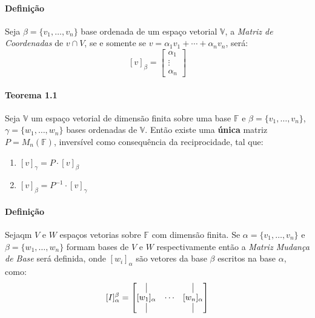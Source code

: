 \documentclass{article}
\begin{document}
        \paragraph{Definição}Seja $\beta = \{ v_{1}, \dots, v_{n} \}$ base ordenada de um espaço vetorial $\mathbb{V}$, a \textit{Matriz de Coordenadas} de $v\cap V$, se e somente se $v=\alpha_{1}v_{1}+\cdots+\alpha_{n}v_{n}$, será:
            \[[v]_{\beta}=\begin{bmatrix}\alpha_{1}\\ \vdots\\ \alpha_{n}\end{bmatrix}\]

        \paragraph{Teorema 1.1}Seja $\mathbb{V}$ um espaço vetorial de dimensão finita sobre uma base $\mathbb{F}$ e $\beta = \{v_{1},\dots,v_{n}\}$, $\gamma = \{w_{1},\dots,w_{n}\}$ bases ordenadas de $\mathbb{V}$. Então existe uma \textbf{única} matriz $P=M_{n}(\mathbb{F})$, inversível como consequência da reciprocidade, tal que:
            \begin{enumerate}[noitemsep]
                \item $[v]_{\gamma} = P \cdot [v]_{\beta}$
                \item $[v]_{\beta} = P^{-1} \cdot [v]_{\gamma}$
            \end{enumerate}

        \paragraph{Definição}Sejaqm $V$ e $W$ espaços vetorias sobre $\mathbb{F}$ com dimensão finita. Se $\alpha = \{v_{1},\dots,v_{n}\}$ e $\beta = \{w_{1},\dots,w_{n}\}$ formam bases de $V$ e $W$ respectivamente então a \textit{Matriz Mudança de Base} será definida, onde $[w_{i}]_{\alpha}$ são vetores da base $\beta$ escritos na base $\alpha$, como:
            \[[I]^{\beta}_{\alpha} = 
                \begin{bmatrix}
                    \vrule           &        & \vrule\\
                    [w_{1}]_{\alpha} & \cdots & [w_{n}]_{\alpha}\\
                    \vrule           &        & \vrule\\
                \end{bmatrix}\]
\end{document}
